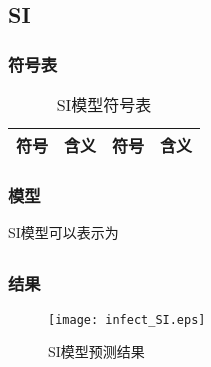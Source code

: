 \subsection{SI}
\subsubsection{符号表}
\begin{table}[H]
	\centering
	\caption{SI模型符号表}
	\begin{tabular}{llll}
		\hline
		符号&含义&符号&含义\\
		\hline
		\hline
	\end{tabular}
\end{table} 
\subsubsection{模型}
	SI模型可以表示为
	\begin{align}
	\end{align}
\subsubsection{结果}
	\begin{figure}[H]
		\centering
		\texttt{[image: infect\_SI.eps]}
		\caption{SI模型预测结果}
	\end{figure}
